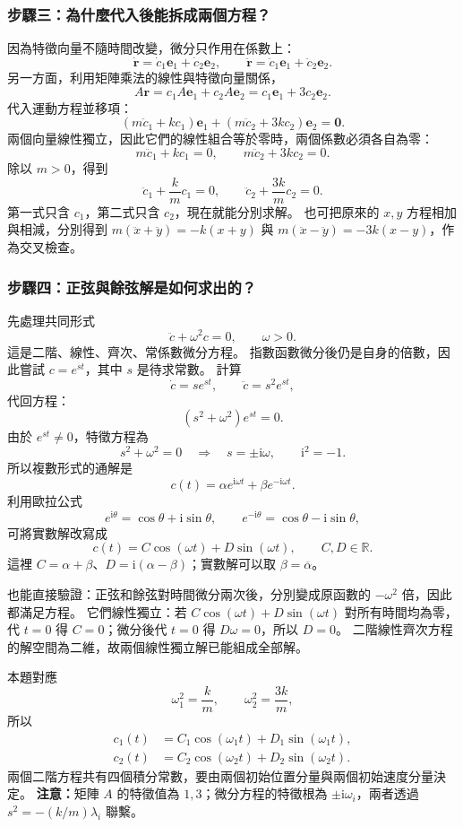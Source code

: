 \documentclass[12pt,a4paper]{article}
\begin{document}
\subsubsection*{步驟三：為什麼代入後能拆成兩個方程？}
因為特徵向量不隨時間改變，微分只作用在係數上：
\[
    \dot{\mathbf r}=\dot c_1\mathbf e_1+\dot c_2\mathbf e_2,\qquad
    \ddot{\mathbf r}=\ddot c_1\mathbf e_1+\ddot c_2\mathbf e_2.
\]
另一方面，利用矩陣乘法的線性與特徵向量關係，
\[
    A\mathbf r=c_1A\mathbf e_1+c_2A\mathbf e_2
    =c_1\mathbf e_1+3c_2\mathbf e_2.
\]
代入運動方程並移項：
\[
    (m\ddot c_1+kc_1)\mathbf e_1
    +(m\ddot c_2+3kc_2)\mathbf e_2=\mathbf0.
\]
兩個向量線性獨立，因此它們的線性組合等於零時，兩個係數必須各自為零：
\[
    m\ddot c_1+kc_1=0,\qquad m\ddot c_2+3kc_2=0.
\]
除以 \(m>0\)，得到
\[
    \boxed{\ddot c_1+\frac{k}{m}c_1=0},\qquad
    \boxed{\ddot c_2+\frac{3k}{m}c_2=0}.
\]
第一式只含 \(c_1\)，第二式只含 \(c_2\)，現在就能分別求解。
也可把原來的 \(x,y\) 方程相加與相減，分別得到
\(m(\ddot x+\ddot y)=-k(x+y)\) 與
\(m(\ddot x-\ddot y)=-3k(x-y)\)，作為交叉檢查。

\subsubsection*{步驟四：正弦與餘弦解是如何求出的？}
先處理共同形式
\[
    \ddot c+\omega^2c=0,\qquad \omega>0.
\]
這是二階、線性、齊次、常係數微分方程。
指數函數微分後仍是自身的倍數，因此嘗試 \(c=e^{st}\)，其中 \(s\) 是待求常數。
計算
\[
    \dot c=se^{st},\qquad \ddot c=s^2e^{st},
\]
代回方程：
\[
    (s^2+\omega^2)e^{st}=0.
\]
由於 \(e^{st}\ne0\)，特徵方程為
\[
    s^2+\omega^2=0\quad\Longrightarrow\quad s=\pm\mathrm i\omega,
    \qquad \mathrm i^2=-1.
\]
所以複數形式的通解是
\[
    c(t)=\alpha e^{\mathrm i\omega t}+\beta e^{-\mathrm i\omega t}.
\]
利用歐拉公式
\[
    e^{\mathrm i\theta}=\cos\theta+\mathrm i\sin\theta,
    \qquad e^{-\mathrm i\theta}=\cos\theta-\mathrm i\sin\theta,
\]
可將實數解改寫成
\[
    \boxed{c(t)=C\cos(\omega t)+D\sin(\omega t)},\qquad C,D\in\mathbb R.
\]
這裡 \(C=\alpha+\beta\)、\(D=\mathrm i(\alpha-\beta)\)；實數解可以取 \(\beta=\overline\alpha\)。

也能直接驗證：正弦和餘弦對時間微分兩次後，分別變成原函數的 \(-\omega^2\) 倍，因此都滿足方程。
它們線性獨立：若 \(C\cos(\omega t)+D\sin(\omega t)\) 對所有時間均為零，代 \(t=0\) 得 \(C=0\)；微分後代 \(t=0\) 得 \(D\omega=0\)，所以 \(D=0\)。
二階線性齊次方程的解空間為二維，故兩個線性獨立解已能組成全部解。

本題對應
\[
    \omega_1^2=\frac{k}{m},\qquad \omega_2^2=\frac{3k}{m},
\]
所以
\[
    \begin{aligned}
        c_1(t) & =C_1\cos(\omega_1t)+D_1\sin(\omega_1t), \\
        c_2(t) & =C_2\cos(\omega_2t)+D_2\sin(\omega_2t).
    \end{aligned}
\]
兩個二階方程共有四個積分常數，要由兩個初始位置分量與兩個初始速度分量決定。
\textbf{注意：}矩陣 \(A\) 的特徵值為 \(1,3\)；微分方程的特徵根為 \(\pm\mathrm i\omega_i\)，兩者透過 \(s^2=-(k/m)\lambda_i\) 聯繫。
\end{document}
